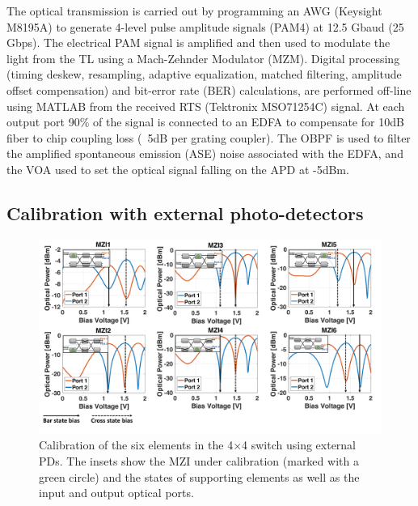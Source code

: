 The optical transmission is carried out by programming an AWG (Keysight M8195A) to generate 4-level pulse amplitude signals (PAM4) at 12.5 Gbaud (25 Gbps). The electrical PAM signal is amplified and then used to modulate the light from the TL using a Mach-Zehnder Modulator (MZM). Digital processing (timing deskew, resampling, adaptive equalization, matched filtering, amplitude offset compensation) and bit-error rate (BER) calculations, are performed off-line using MATLAB from the received RTS (Tektronix MSO71254C) signal. At each output port 90\% of the signal is connected to an EDFA to compensate for 10dB fiber to chip coupling loss (~5dB per grating coupler). The OBPF is used to filter the amplified spontaneous emission (ASE) noise associated with the EDFA, and the VOA used to set the optical signal falling on the APD at -5dBm.


% 
% 


\subsection{Calibration with external photo-detectors}

\begin{figure}[t]
\centering\includegraphics[width=13cm]{Chapter5/fig7_PD_charac}
\caption{Calibration of the six elements in the 4$\times$4 switch using external PDs. The insets show the MZI under calibration (marked with a green circle) and the states of supporting elements as well as the input and output optical ports.}
\end{figure}

